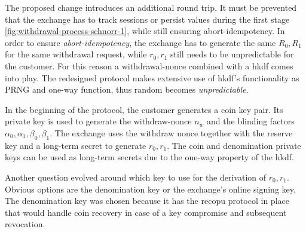 The proposed change introduces an additional round trip.
It must be prevented that the exchange has to track sessions or persist values during the first stage \ref{fig:withdrawal-process-schnorr-1}, while still ensuring \gls{abort-idempotency}.
In order to ensure \textit{\gls{abort-idempotency}}, the exchange has to generate the same $R_0,R_1$ for the same withdrawal request, while $r_0,r_1$ still needs to be unpredictable for the customer.
For this reason a withdrawal-nonce combined with a \gls{hkdf} comes into play.
The redesigned protocol makes extensive use of \gls{hkdf}'s functionality as \ac{PRNG} and one-way function, thus random becomes \textit{unpredictable}.

In the beginning of the protocol, the customer generates a coin key pair.
Its private key is used to generate the withdraw-nonce $n_w$ and the blinding factors $\alpha_0, \alpha_1, \beta_0, \beta_1$.
The exchange uses the withdraw nonce together with the reserve key and a long-term secret to generate $r_0, r_1$.
The coin and denomination private keys can be used as long-term secrets due to the one-way property of the \gls{hkdf}.

Another question evolved around which key to use for the derivation of $ r_0, r_1 $.
Obvious options are the denomination key or the exchange's online signing key.
The denomination key was chosen because it has the recopu protocol in place that would handle coin recovery in case of a key compromise and subsequent revocation.

